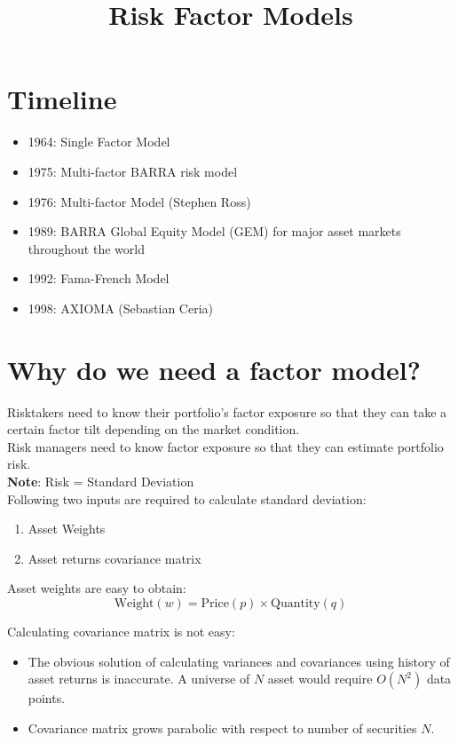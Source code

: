 \documentclass{article}
\begin{document}
\title{Risk Factor Models}
\author{}
\date{}
\maketitle

\section*{Timeline}
\begin{itemize}
    \item 1964: Single Factor Model
    \item 1975: Multi-factor BARRA risk model 
    \item 1976: Multi-factor Model (Stephen Ross)
    \item 1989: BARRA Global Equity Model (GEM) for major asset markets throughout the world
    \item 1992: Fama-French Model
    \item 1998: AXIOMA (Sebastian Ceria)
\end{itemize}


\section*{Why do we need a factor model?}
Risktakers need to know their portfolio's factor exposure so that they can take a certain factor tilt depending on the market condition.\\
Risk managers need to know factor exposure so that they can estimate portfolio risk.\\ 
\textbf{Note}: Risk = Standard Deviation \\

Following two inputs are required to calculate standard deviation:
\begin{enumerate}
    \item Asset Weights
    \item Asset returns covariance matrix
\end{enumerate}

Asset weights are easy to obtain:
\begin{equation}
    \text{Weight}(w) = \text{Price}(p) \times \text{Quantity}(q)
\end{equation}

Calculating covariance matrix is not easy:
\begin{itemize}
    \item The obvious solution of calculating variances and covariances using history of asset returns is inaccurate. A universe of \( N \) asset would require \( O(N^2) \) data points.
    \item Covariance matrix grows parabolic with respect to number of securities \( N \).
\end{itemize}
\end{document}
